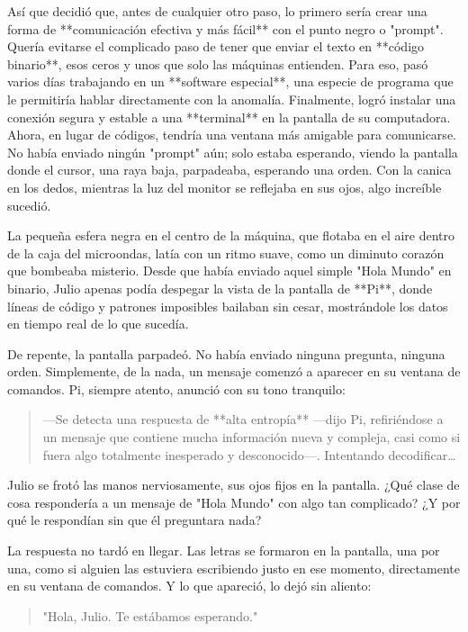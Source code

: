 \documentclass[a4paper,12pt]{book}
\begin{document}
Así que decidió que, antes de cualquier otro paso, lo primero sería crear una forma de **comunicación efectiva y más fácil** con el punto negro o "prompt". Quería evitarse el complicado paso de tener que enviar el texto en **código binario**, esos ceros y unos que solo las máquinas entienden. Para eso, pasó varios días trabajando en un **software especial**, una especie de programa que le permitiría hablar directamente con la anomalía. Finalmente, logró instalar una conexión segura y estable a una **terminal** en la pantalla de su computadora. Ahora, en lugar de códigos, tendría una ventana más amigable para comunicarse. No había enviado ningún "prompt" aún; solo estaba esperando, viendo la pantalla donde el cursor, una raya baja, parpadeaba, esperando una orden. Con la canica en los dedos, mientras la luz del monitor se reflejaba en sus ojos, algo increíble sucedió.

La pequeña esfera negra en el centro de la máquina, que flotaba en el aire dentro de la caja del microondas, latía con un ritmo suave, como un diminuto corazón que bombeaba misterio. Desde que había enviado aquel simple "Hola Mundo" en binario, Julio apenas podía despegar la vista de la pantalla de **Pi**, donde líneas de código y patrones imposibles bailaban sin cesar, mostrándole los datos en tiempo real de lo que sucedía.

De repente, la pantalla parpadeó. No había enviado ninguna pregunta, ninguna orden. Simplemente, de la nada, un mensaje comenzó a aparecer en su ventana de comandos. Pi, siempre atento, anunció con su tono tranquilo:

\begin{quote}
    —Se detecta una respuesta de **alta entropía** —dijo Pi, refiriéndose a un mensaje que contiene mucha información nueva y compleja, casi como si fuera algo totalmente inesperado y desconocido—. Intentando decodificar…
\end{quote}

Julio se frotó las manos nerviosamente, sus ojos fijos en la pantalla. ¿Qué clase de cosa respondería a un mensaje de "Hola Mundo" con algo tan complicado? ¿Y por qué le respondían sin que él preguntara nada?

La respuesta no tardó en llegar. Las letras se formaron en la pantalla, una por una, como si alguien las estuviera escribiendo justo en ese momento, directamente en su ventana de comandos. Y lo que apareció, lo dejó sin aliento:

\begin{quote}
    "Hola, Julio. Te estábamos esperando."
\end{quote}
\end{document}
